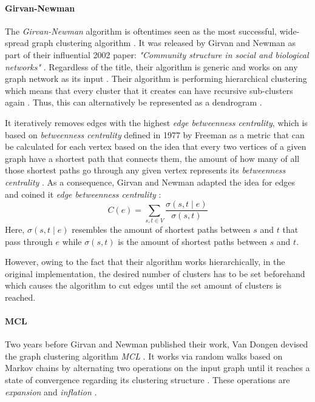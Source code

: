 \documentclass[12pt,a4paper]{report}
\begin{document}
\paragraph{Girvan-Newman \cite{girvan2002community}}
The \textit{Girvan-Newman} algorithm is oftentimes seen as the most successful,
wide-spread graph clustering algorithm \cite{lancichinetti2009community}.
It was released by Girvan and Newman as part of their influential 2002 paper:
\textit{"Community structure in social and biological networks"} \cite{girvan2002community}.
Regardless of the title, their algorithm is generic and works on any graph network
as its input \cite{lancichinetti2009community}.
Their algorithm is performing hierarchical clustering which means that
every cluster that it creates can have recursive sub-clusters
again \cite{girvan2002community}.
Thus, this can alternatively be represented as a dendrogram \cite{newman2004fast}.

It iteratively removes edges with the highest
\textit{edge betweenness centrality}, which is based on
\textit{betweenness centrality} defined in 1977 by Freeman as
a metric that can be calculated for each vertex based on the idea that every
two vertices of a given graph have a shortest path that connects them,
the amount of how many of all those shortest paths go through any given vertex
represents its \textit{betweenness centrality} \cite{freeman1977set}.
As a consequence, Girvan and Newman adapted the idea for edges and coined it
\textit{edge betweenness centrality} \cite{girvan2002community}:
\[
  C(e) = \sum_{s, t \in V} \frac{\sigma(s, t \mid e)}{\sigma(s, t)}
\]
Here, \(\sigma(s, t \mid e)\) resembles the amount of shortest paths
between \(s\) and \(t\) that pass through \(e\) while \(\sigma(s, t)\)
is the amount of shortest paths between \(s\) and \(t\).

However, owing to the fact that their algorithm works hierarchically,
in the original implementation, the desired number of clusters has to be set
beforehand which causes the algorithm to cut edges until the set amount of
clusters is reached.

\paragraph{MCL \cite{vandongen2000graph}}
Two years before Girvan and Newman published their work, Van Dongen devised
the graph clustering algorithm \textit{MCL} \cite{vandongen2000graph}.
It works via random walks based on Markov chains by alternating two operations
on the input graph until it reaches a state of convergence regarding its
clustering structure \cite{vandongen2000graph}. These operations are
\textit{expansion} and \textit{inflation} \cite{vandongen2000graph}.
\end{document}
